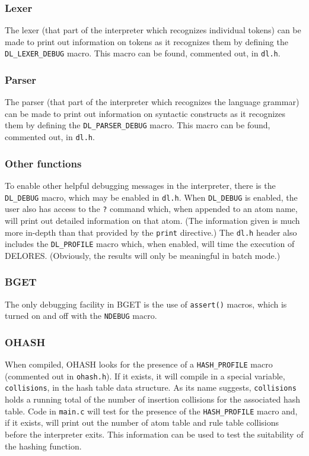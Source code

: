 \documentclass[a4paper,10pt,twocolumn]{article}
\begin{document}
\subsubsection{Lexer}

The lexer (that part of the interpreter which recognizes individual
tokens) can be made to print out information on tokens as it
recognizes them by defining the \texttt{DL\_LEXER\_DEBUG} macro. This
macro can be found, commented out, in \texttt{dl.h}.

\subsubsection{Parser}

The parser (that part of the interpreter which recognizes the language
grammar) can be made to print out information on syntactic constructs
as it recognizes them by defining the \texttt{DL\_PARSER\_DEBUG}
macro. This macro can be found, commented out, in \texttt{dl.h}.

\subsubsection{Other functions}

To enable other helpful debugging messages in the interpreter, there
is the \texttt{DL\_DEBUG} macro, which may be enabled in
\texttt{dl.h}. When \texttt{DL\_DEBUG} is enabled, the user also has
access to the \texttt{?} command which, when appended to an atom name,
will print out detailed information on that atom. (The information
given is much more in-depth than that provided by the \texttt{print}
directive.) The \texttt{dl.h} header also includes the
\texttt{DL\_PROFILE} macro which, when enabled, will time the
execution of DELORES.  (Obviously, the results will only be meaningful
in batch mode.)

\subsubsection{BGET}

The only debugging facility in BGET is the use of \texttt{assert()}
macros, which is turned on and off with the \texttt{NDEBUG} macro.

\subsubsection{OHASH}

When compiled, OHASH looks for the presence of a
\texttt{HASH\_PROFILE} macro (commented out in \texttt{ohash.h}). If
it exists, it will compile in a special variable, \texttt{collisions},
in the hash table data structure. As its name suggests,
\texttt{collisions} holds a running total of the number of insertion
collisions for the associated hash table. Code in \texttt{main.c} will
test for the presence of the \texttt{HASH\_PROFILE} macro and, if it
exists, will print out the number of atom table and rule table
collisions before the interpreter exits. This information can be used
to test the suitability of the hashing function.
\end{document}
